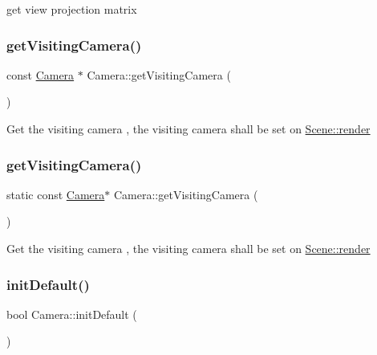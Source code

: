 get view projection matrix \mbox{\label{classCamera_a71a044ac0a08723ac89ca69deb460f47}} 
\subsubsection{\texorpdfstring{get\+Visiting\+Camera()}{getVisitingCamera()}\hspace{0.1cm}{\footnotesize\ttfamily [1/2]}}
{\footnotesize\ttfamily const \hyperlink{classCamera}{Camera} $\ast$ Camera\+::get\+Visiting\+Camera (\begin{DoxyParamCaption}{ }\end{DoxyParamCaption})\hspace{0.3cm}{\ttfamily [static]}}

Get the visiting camera , the visiting camera shall be set on \hyperlink{classScene_a26d5468761d68ff0f3beb177bf8d2734}{Scene\+::render} \mbox{\label{classCamera_a05d272fef59bf6a8bac284d12095b443}} 
\subsubsection{\texorpdfstring{get\+Visiting\+Camera()}{getVisitingCamera()}\hspace{0.1cm}{\footnotesize\ttfamily [2/2]}}
{\footnotesize\ttfamily static const \hyperlink{classCamera}{Camera}$\ast$ Camera\+::get\+Visiting\+Camera (\begin{DoxyParamCaption}{ }\end{DoxyParamCaption})\hspace{0.3cm}{\ttfamily [static]}}

Get the visiting camera , the visiting camera shall be set on \hyperlink{classScene_a26d5468761d68ff0f3beb177bf8d2734}{Scene\+::render} \mbox{\label{classCamera_a4bdc70b1156c5b4cbdb5706cb75fb598}} 
\subsubsection{\texorpdfstring{init\+Default()}{initDefault()}\hspace{0.1cm}{\footnotesize\ttfamily [1/2]}}
{\footnotesize\ttfamily bool Camera\+::init\+Default (\begin{DoxyParamCaption}{ }\end{DoxyParamCaption})}

